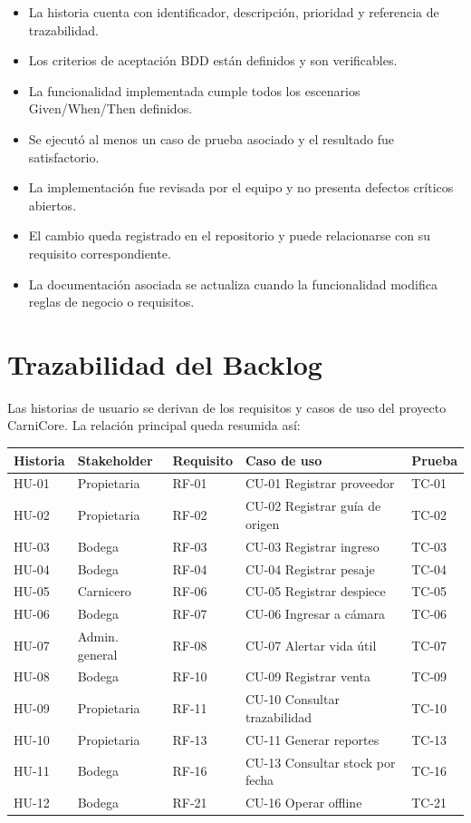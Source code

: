 \documentclass[11pt,a4paper]{article}
\begin{document}
\begin{itemize}[leftmargin=1.1cm]
\item La historia cuenta con identificador, descripción, prioridad y referencia de trazabilidad.
\item Los criterios de aceptación BDD están definidos y son verificables.
\item La funcionalidad implementada cumple todos los escenarios Given/When/Then definidos.
\item Se ejecutó al menos un caso de prueba asociado y el resultado fue satisfactorio.
\item La implementación fue revisada por el equipo y no presenta defectos críticos abiertos.
\item El cambio queda registrado en el repositorio y puede relacionarse con su requisito correspondiente.
\item La documentación asociada se actualiza cuando la funcionalidad modifica reglas de negocio o requisitos.
\end{itemize}

\section{Trazabilidad del Backlog}
Las historias de usuario se derivan de los requisitos y casos de uso del proyecto CarniCore.
La relación principal queda resumida así:

\begin{longtable}{>{\raggedright\arraybackslash}p{1.4cm}
>{\raggedright\arraybackslash}p{2.5cm}
>{\raggedright\arraybackslash}p{3.4cm}
>{\raggedright\arraybackslash}p{3.3cm}
>{\raggedright\arraybackslash}p{2.1cm}}
\toprule
\textbf{Historia} & \textbf{Stakeholder} & \textbf{Requisito} & \textbf{Caso de uso} & \textbf{Prueba}\\
\midrule
HU-01 & Propietaria & RF-01 & CU-01 Registrar proveedor & TC-01\\
HU-02 & Propietaria & RF-02 & CU-02 Registrar guía de origen & TC-02\\
HU-03 & Bodega & RF-03 & CU-03 Registrar ingreso & TC-03\\
HU-04 & Bodega & RF-04 & CU-04 Registrar pesaje & TC-04\\
HU-05 & Carnicero & RF-06 & CU-05 Registrar despiece & TC-05\\
HU-06 & Bodega & RF-07 & CU-06 Ingresar a cámara & TC-06\\
HU-07 & Admin. general & RF-08 & CU-07 Alertar vida útil & TC-07\\
HU-08 & Bodega & RF-10 & CU-09 Registrar venta & TC-09\\
HU-09 & Propietaria & RF-11 & CU-10 Consultar trazabilidad & TC-10\\
HU-10 & Propietaria & RF-13 & CU-11 Generar reportes & TC-13\\
HU-11 & Bodega & RF-16 & CU-13 Consultar stock por fecha & TC-16\\
HU-12 & Bodega & RF-21 & CU-16 Operar offline & TC-21\\
\bottomrule
\end{longtable}
\end{document}
